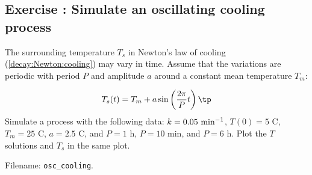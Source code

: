 \documentclass[graybox,sectrefs,envcountresetchap,open=right,final]{svmonodo}
\newenvironment{doconceexercise}{}{}
\newcounter{doconceexercisecounter}
\begin{document}
\begin{doconceexercise}

\subsection*{Exercise \thedoconceexercisecounter: Simulate an oscillating cooling process}

\label{decay:app:exer:cooling:osc}

The surrounding temperature $T_s$ in Newton's law of cooling
(\ref{decay:Newton:cooling}) may vary in time. Assume that the
variations are periodic with period $P$ and amplitude $a$ around
a constant mean temperature $T_m$:

\begin{equation}
T_s(t) = T_m + a\sin\left(\frac{2\pi}{P}t\right)
\tp
\end{equation}
Simulate a process with the following data: $k=0.05 \hbox{ min}^{-1}$,
$T(0)=5$ C, $T_m=25$ C, $a=2.5$ C, and $P=1$ h, $P=10$ min, and $P=6$ h.
Plot the $T$ solutions and $T_s$ in the same plot.


\noindent Filename: \Verb!osc_cooling!.

\end{doconceexercise}
\end{document}
